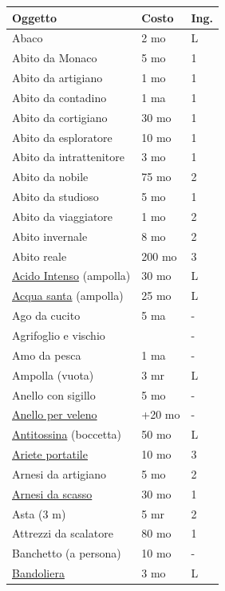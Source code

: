 \begin{multicols}{2}
\noindent\begin{tabularx}{\linewidth}{Xll}
	\toprule
\rowcolor{gray!20}\textbf{Oggetto}& \textbf{Costo} & \textbf{Ing.}\\
\toprule
Abaco&2 mo&L\\
\rowcolor{gray!20}Abito da Monaco & 5 mo& 1\\
Abito da artigiano& 1 mo& 1\\
\rowcolor{gray!20}Abito da contadino& 1 ma& 1\\
Abito da cortigiano& 30 mo& 1\\
\rowcolor{gray!20}Abito da esploratore& 10 mo& 1\\
Abito da intrattenitore & 3 mo& 1\\
\rowcolor{gray!20}Abito da nobile & 75 mo& 2\\
Abito da studioso & 5 mo& 1\\
\rowcolor{gray!20}Abito da viaggiatore& 1 mo& 2\\
Abito invernale & 8 mo& 2\\
\rowcolor{gray!20}Abito reale & 200 mo & 3\\
\hyperlink{Acido Intenso}{Acido Intenso} (ampolla) & 30 mo& L \\
\rowcolor{gray!20}\hyperlink{Acqua santa}{Acqua santa} (ampolla) & 25 mo& L\\
Ago da cucito & 5 ma &- \\
\rowcolor{gray!20}Agrifoglio e vischio & & -\\
Amo da pesca & 1 ma & - \\
\rowcolor{gray!20}Ampolla (vuota) & 3 mr & L \\
Anello con sigillo& 5 mo& - \\
\rowcolor{gray!20}\hyperlink{Anello per veleno}{Anello per veleno} & +20 mo&-\\
\hyperlink{Antitossina}{Antitossina} (boccetta)& 50 mo& L\\
\rowcolor{gray!20}\hyperlink{Ariete portatile}{Ariete portatile}& 10 mo& 3 \\
Arnesi da artigiano& 5 mo& 2\\
\rowcolor{gray!20}\hyperlink{Attrezzi da scasso}{Arnesi da scasso}& 30 mo& 1\\
Asta (3 m)& 5 mr& 2\\
\rowcolor{gray!20}Attrezzi da scalatore & 80 mo& 1\\
Banchetto (a persona) & 10 mo& -\\
\rowcolor{gray!20}\hyperlink{Bandoliera}{Bandoliera} & 3 mo & L\\

\end{tabularx}
\end{multicols}
